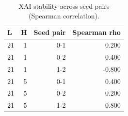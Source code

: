 \begin{table}[!htbp]
\centering
\caption{XAI stability across seed pairs (Spearman correlation).}
\label{tab:xai-stability}
\begin{tabular}{lrrr}
\toprule
L & H & Seed pair & Spearman rho \\
\midrule
21 & 1 & 0-1 & 0.200 \\
21 & 1 & 0-2 & 0.400 \\
21 & 1 & 1-2 & -0.800 \\
21 & 5 & 0-1 & 0.400 \\
21 & 5 & 0-2 & 0.200 \\
21 & 5 & 1-2 & 0.800 \\
\bottomrule
\end{tabular}
\end{table}
